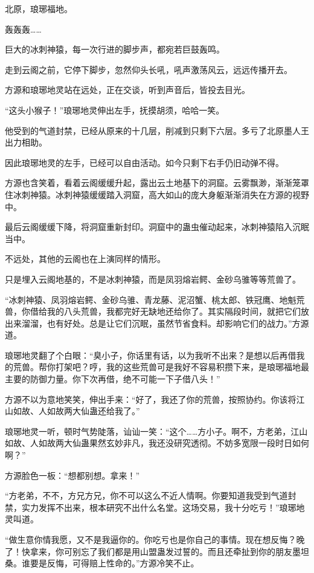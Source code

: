 
\begin{this_body}

北原，琅琊福地。

轰轰轰……

巨大的冰刺神猿，每一次行进的脚步声，都宛若巨鼓轰鸣。

走到云阁之前，它停下脚步，忽然仰头长吼，吼声激荡风云，远远传播开去。

方源和琅琊地灵站在远处，正在交谈，听到声音后，皆投去目光。

“这头小猴子！”琅琊地灵伸出左手，抚摸胡须，哈哈一笑。

他受到的气道封禁，已经从原来的十几层，削减到只剩下六层。多亏了北原墨人王出力相助。

因此琅琊地灵的左手，已经可以自由活动。如今只剩下右手仍旧动弹不得。

方源也含笑着，看着云阁缓缓升起，露出云土地基下的洞窟。云雾飘渺，渐渐笼罩住冰刺神猿。冰刺神猿缓缓踏入洞窟，高大如山的庞大身躯渐渐消失在方源的视野中。

最后云阁缓缓下降，将洞窟重新封印。洞窟中的蛊虫催动起来，冰刺神猿陷入沉眠当中。

不远处，其他的云阁也在上演同样的情形。

只是埋入云阁地基的，不是冰刺神猿，而是凤羽熔岩鳄、金砂乌骓等等荒兽了。

“冰刺神猿、凤羽熔岩鳄、金砂乌骓、青龙藤、泥沼蟹、桃太郎、铁冠鹰、地魁荒兽，你借给我的八头荒兽，我都完好无缺地还给你了。其实隔段时间，就把它们放出来溜溜，也有好处。总是让它们沉眠，虽然节省食料。却影响它们的战力。”方源道。

琅琊地灵翻了个白眼：“臭小子，你话里有话，以为我听不出来？是想以后再借我的荒兽。帮你打架吧？哼，我的这些荒兽可是我好不容易积攒下来，是琅琊福地最主要的防御力量。你下次再借，绝不可能一下子借八头！”

方源不以为意地笑笑，伸出手来：“好了，我还了你的荒兽，按照协约。你该将江山如故、人如故两大仙蛊还给我了。”

琅琊地灵一听，顿时气势陡落，讪讪一笑：“这个……方小子。啊不，方老弟，江山如故、人如故两大仙蛊果然玄妙非凡，我还没研究透彻。不妨多宽限一段时日如何啊？”

方源脸色一板：“想都别想。拿来！”

“方老弟，不不，方兄方兄，你不可以这么不近人情啊。你要知道我受到气道封禁，实力发挥不出来，根本研究不出什么名堂。这场交易，我十分吃亏！”琅琊地灵叫道。

“做生意你情我愿，又不是我逼你的。你吃亏也是你自己的事情。现在想反悔？晚了！快拿来，你可别忘了我们都是用山盟蛊发过誓的。而且还牵扯到你的朋友墨坦桑。谁要是反悔，可得赔上性命的。”方源冷笑不止。


\end{this_body}
